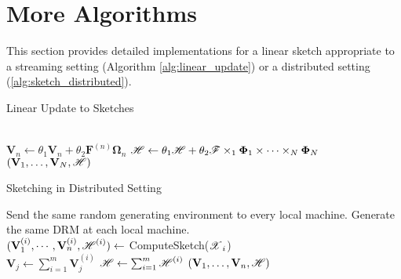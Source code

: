 \section{More Algorithms}
This section provides detailed implementations
for a linear sketch appropriate to a streaming setting (Algorithm \ref{alg:linear_update})
or a distributed setting (\ref{alg:sketch_distributed}).
\label{appendix:more_algorithms}
\begin{algorithm}[th]
	\caption{Linear Update to Sketches}\label{alg:linear_update}
	\begin{algorithmic}[1]
		\\
		\State $\mathbf{V}_n \leftarrow \theta_1 \mathbf{V}_n + \theta_2 \mathbf{F}^{(n)} \mathbf{\Omega}_n$ 
		\State $\T{H} \leftarrow \theta_1 \T{H} + \theta_2 \T{F} \times_1 \mathbf{\Phi}_1 \times \cdots \times_N \mathbf{\Phi}_N $
		\State \Return $(\mathbf{V}_1, \dots, \mathbf{V}_N, \T{H})$
		\EndFunction
	\end{algorithmic}
\end{algorithm}

\begin{algorithm}[th]
\begin{algorithmic}[1]
\caption{Sketching in Distributed Setting}\label{alg:sketch_distributed}
\State Send the same random generating environment to every local machine.
\State Generate the same DRM at each local machine.\\
\State $(\mathbf{V}_1^{(i)}, \cdots,\mathbf{V}_n^{(i)}, \T{H}^{(i)}) \leftarrow$ ComputeSketch($\T{X}_i$)\\
\State $\mathbf{V}_j\leftarrow \sum_{i=1}^m \mathbf{V}_j^{(i)}$
\State $\T{H} \leftarrow \sum_{i=1}^m \T{H}^{(i)}$
\State \Return $(\mathbf{V}_1, \dots, \mathbf{V}_n, \T{H})$
\EndFunction
\end{algorithmic}
\end{algorithm}
